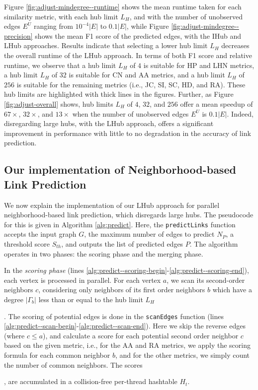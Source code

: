Figure \ref{fig:adjust-mindegree--runtime} shows the mean runtime taken for each similarity metric, with each hub limit $L_H$, and with the number of unobserved edges $E^U$ ranging from $10^{-4}|E|$ to $0.1|E|$, while Figure \ref{fig:adjust-mindegree--precision} shows the mean F1 score of the predicted edges, with the IHub and LHub approaches. Results indicate that selecting a lower hub limit $L_H$ decreases the overall runtime of the LHub approach. In terms of both F1 score and relative runtime, we observe that a hub limit $L_H$ of $4$ is suitable for HP and LHN metrics, a hub limit $L_H$ of $32$ is suitable for CN and AA metrics, and a hub limit $L_H$ of $256$ is suitable for the remaining metrics (i.e., JC, SI, SC, HD, and RA). These hub limits are highlighted with thick lines in the figures. Further, as Figure \ref{fig:adjust-overall} shows, hub limits $L_H$ of $4$, $32$, and $256$ offer a mean speedup of $67\times$, $32\times$, and $13\times$ when the number of unobserved edges $E^U$ is $0.1|E|$. Indeed, disregarding large hubs, with the LHub approach, offers a significant improvement in performance with little to no degradation in the accuracy of link prediction.




\subsection{Our implementation of Neighborhood-based Link Prediction}

We now explain the implementation of our LHub approach for parallel neighborhood-based link prediction, which disregards large hubs. The pseudocode for this is given in Algorithm \ref{alg:predict}. Here, the \texttt{predictLinks} function accepts the input graph $G$, the maximum number of edges to predict $N_P$, a threshold score $S_{th}$, and outputs the list of predicted edges $P$. The algorithm operates in two phases: the scoring phase and the merging phase.

In the \textit{scoring phase} (lines \ref{alg:predict--scoring-begin}-\ref{alg:predict--scoring-end}), each vertex is processed in parallel. For each vertex $a$, we scan its second-order neighbors $c$, considering only neighbors of its first order neighbors $b$ which have a degree $|\Gamma_b|$ less than or equal to the hub limit $L_H$. The scoring of potential edges is done in the \texttt{scanEdges} function (lines \ref{alg:predict--scan-begin}-\ref{alg:predict--scan-end}). Here we skip the reverse edges (where $c \leq a$), and calculate a score for each potential second order neighbor $c$ based on the given metric, i.e., for the AA and RA metrics, we apply the scoring formula for each common neighbor $b$, and for the other metrics, we simply count the number of common neighbors. The scores, are accumulated in a collision-free per-thread hashtable $H_t$.

